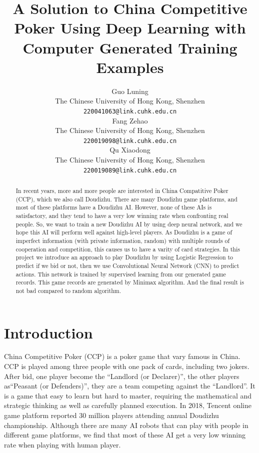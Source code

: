 \documentclass{article}
\title{A Solution to China Competitive Poker Using Deep Learning with Computer Generated Training Examples}
\author{
  Guo Luning \\
  The Chinese University of Hong Kong, Shenzhen\\
  \texttt{220041063@link.cuhk.edu.cn} \\
   \And
   Fang Zehao \\
   The Chinese University of Hong Kong, Shenzhen\\
   \texttt{220019098@link.cuhk.edu.cn} \\
   \And
   Qu Xiaodong \\
   The Chinese University of Hong Kong, Shenzhen\\
   \texttt{220019089@link.cuhk.edu.cn} \\
}
\begin{document}
\maketitle

\begin{abstract}
  In recent years, more and more people are interested in China Compatitive Poker (CCP), which we also call Doudizhu. There are many Doudizhu game platforms, and most of these platforms have a Doudizhu AI. However, none of these AIs is satisfactory, and they tend to have a very low winning rate when confronting real people. So, we want to train a new Doudizhu AI by using deep neural network, and we hope this AI will perform well against high-level players. As Doudizhu is a game of imperfect information (with private information, random) with multiple rounds of cooperation and competition, this causes us to have a varity of card strategies. In this project we introduce an approach to play Doudizhu by using Logistic Regression to predict if we bid or not, then we use  Convolutional Neural Network (CNN) to predict actions. This network is trained by supervised learning from our generated game records. This game records are generated by Minimax algorithm. And the final result is not bad compared to random algorithm.
\end{abstract}

\section{Introduction}

China Competitive Poker (CCP) is a poker game that vary famous in China. CCP is played among three people with one pack of cards, including two jokers. After bid, one player become the ``Landlord (or Declarer)'', the other players as``Peasant (or Defenders)'', they are a team competing against the ``Landlord''. It is a game that easy to learn but hard to master, requiring the mathematical and strategic thinking as well as carefully planned execution. In 2018, Tencent online game platform reported 30 million players attending annual Doudizhu championship. Although there are many AI robots that can play with people in different game platforms, we find that most of these AI get a very low winning rate when playing with human player.
\end{document}
